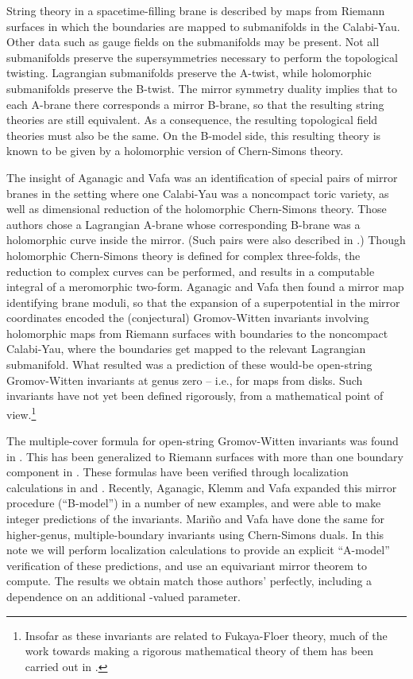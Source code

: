 \documentclass[a4paper,11pt]{article}
\providecommand{\Z}{\mathbb{Z}}
\begin{document}
String theory
in a spacetime-filling brane is described by maps from
Riemann surfaces in which the boundaries are mapped to
submanifolds in the Calabi-Yau.  Other data such as gauge
fields on the submanifolds may be present.
Not all submanifolds preserve the supersymmetries necessary
to perform the topological twisting.
Lagrangian submanifolds preserve the A-twist,
while holomorphic submanifolds preserve the B-twist.
The mirror symmetry duality implies that to each A-brane
there corresponds a mirror B-brane, so that the
resulting string theories are still equivalent.  As a consequence,
the resulting topological field theories must also be the
same.  On the B-model side, this resulting theory
is known \cite{BCOV} \cite{Witten} 
to be given by a holomorphic version of Chern-Simons theory.

The insight of Aganagic and Vafa
\cite{AV} was an identification of
special pairs of mirror branes in the setting where one
Calabi-Yau was a noncompact toric variety,
as well as dimensional
reduction of the holomorphic Chern-Simons theory.
Those authors chose a Lagrangian A-brane whose corresponding
B-brane was a holomorphic curve inside the mirror.
(Such pairs were also described in \cite{Hori}.)
Though holomorphic Chern-Simons theory is defined for complex
three-folds, the reduction to complex curves 
can be performed, and results in a computable integral of a meromorphic
two-form.  Aganagic and Vafa
then found a mirror map
identifying brane moduli, so that the expansion of a superpotential
in the mirror coordinates encoded the (conjectural) Gromov-Witten
invariants involving holomorphic
maps from Riemann surfaces with boundaries
to the noncompact Calabi-Yau, where
the boundaries get mapped
to the relevant Lagrangian submanifold.
What resulted was a prediction of these would-be
open-string Gromov-Witten
invariants at genus zero -- i.e., for maps from disks.
Such invariants have not yet been defined rigorously, from a
mathematical point of view.\footnote{Insofar as these
invariants are
related to Fukaya-Floer theory, much of the work towards making
a rigorous mathematical theory of them has been carried out in \cite{FOOO}.}

The multiple-cover formula for open-string
Gromov-Witten invariants
was found in \cite{OV}.  This has been generalized to
Riemann surfaces with more than one boundary component
in \cite{LMV}.
These formulas have been verified through
localization calculations in \cite{LS} and \cite{KL}.
Recently, Aganagic, Klemm and Vafa \cite{AKV}
expanded this mirror
procedure (``B-model'')
in a number of new examples, and were able to make
integer predictions of the invariants.  
Mari\~no and Vafa \cite{MV} have done the same for
higher-genus, multiple-boundary invariants
using Chern-Simons duals.
In this note we will
perform localization calculations to provide an
explicit ``A-model''
verification of these predictions,
and use an equivariant mirror theorem \cite{E} to compute.
The results we obtain match those
authors' perfectly, including a dependence on an
additional \myHighlight{$\Z$}\coordHE{}-valued parameter.
\end{document}
